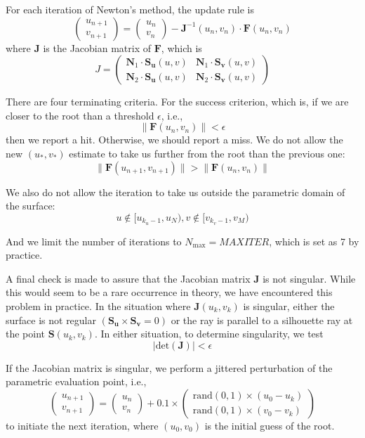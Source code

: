 \documentclass[acmtog]{acmart}
\begin{document}
For each iteration of Newton's method, the update rule is
\[
    \begin{pmatrix}
        u_{n+1}\\
        v_{n+1}
    \end{pmatrix}
    =
    \begin{pmatrix}
        u_{n}\\
        v_{n}
    \end{pmatrix}
    -\mathbf{J}^{-1}(u_n,v_n)\cdot\mathbf{F}(u_n,v_n)
\]
where $\mathbf{J}$ is the Jacobian matrix of $\mathbf{F}$, which is
\[
    J=\begin{pmatrix}
        \mathbf{N}_1\cdot\mathbf{S}_{\mathbf{u}}(u,v)&\mathbf{N}_1\cdot\mathbf{S}_{\mathbf{v}}(u,v)\\
        \mathbf{N}_2\cdot\mathbf{S}_{\mathbf{u}}(u,v)&\mathbf{N}_2\cdot\mathbf{S}_{\mathbf{v}}(u,v)
    \end{pmatrix}
\]

There are four terminating criteria. For the success criterion, which is, if we are closer to the root than a threshold $\epsilon$, i.e.,
\[
    \lVert\mathbf{F}(u_n,v_n)\rVert<\epsilon
\]
then we report a hit. Otherwise, we should report a miss. We do not allow the new $(u_*,v_*)$ estimate to take us further from the root than the previous one:
\[
    \lVert\mathbf{F}(u_{n+1},v_{n+1})\rVert>\lVert\mathbf{F}(u_n,v_n)\rVert
\]

We also do not allow the iteration to take us outside the parametric domain of the surface:
\[
    u\notin[u_{k_u-1},u_N),v\notin[v_{k_v-1},v_M)
\]

And we limit the number of iterations to $N_{\text{max}}=MAXITER$, which is set as 7 by practice.

A final check is made to assure that the Jacobian matrix $\mathbf{J}$ is not singular. While this would seem to be a rare occurrence in theory, we have encountered this problem in practice. In the situation where $\mathbf{J}(u_k,v_k)$ is singular, either the surface is not regular $(\mathbf{S}_{\mathbf{u}} \times \mathbf{S}_{\mathbf{v}} = 0)$ or the ray is parallel to a silhouette ray at the point $\mathbf{S}(u_k , v_k)$. In either situation, to determine singularity, we test
\[|\mathrm{det}(\mathbf{J})|<\epsilon\]

If the Jacobian matrix is singular, we perform a jittered perturbation of the parametric evaluation point, i.e.,
\[
    \begin{pmatrix}
        u_{n+1}\\
        v_{n+1}
    \end{pmatrix}
    =
    \begin{pmatrix}
        u_{n}\\
        v_{n}
    \end{pmatrix}
    +0.1\times
    \begin{pmatrix}
        \mathrm{rand}(0,1)\times(u_0-u_k)\\
        \mathrm{rand}(0,1)\times(v_0-v_k)
    \end{pmatrix}
\]
to initiate the next iteration, where $(u_0,v_0)$ is the initial guess of the root.
\end{document}
